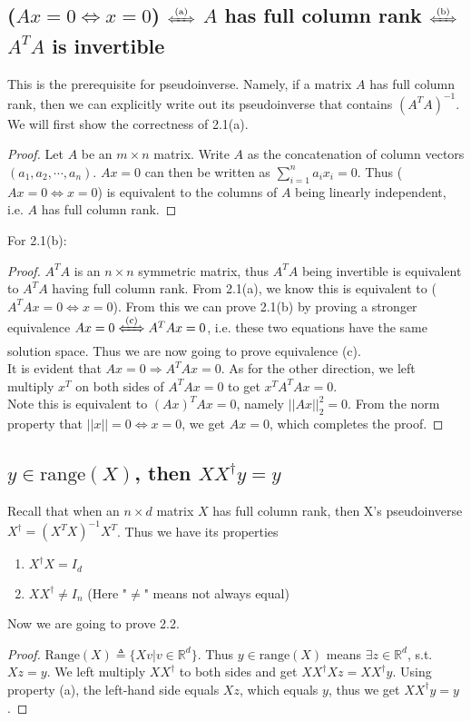 \documentclass[11pt]{article}
\begin{document}
\subsection{($Ax=0 \Leftrightarrow x=0$) $\xLeftrightarrow{\text{(a)}}$ $A$ has full column rank $\xLeftrightarrow{\text{(b)}}$ $A^{T}A$ is invertible}
This is the prerequisite for pseudoinverse. Namely, if a matrix $A$ has full column rank, then we can explicitly write out its pseudoinverse that contains $(A^{T}A)^{-1}$.\\

We will first show the correctness of 2.1(a).
\begin{proof}
Let $A$ be an $m \times n$ matrix. Write $A$ as the concatenation of column vectors $(a_1, a_2, \cdots, a_n)$. $Ax=0$ can then be written as $\sum_{i=1}^n a_i x_i=0$. Thus ($Ax=0 \Leftrightarrow x=0$) is equivalent to the columns of $A$ being linearly independent, i.e. $A$ has full column rank.
\end{proof}
For 2.1(b):
\begin{proof}
$A^{T}A$ is an $n \times n$ symmetric matrix, thus $A^{T}A$ being invertible is equivalent to $A^{T}A$ having full column rank. From 2.1(a), we know this is equivalent to ($A^{T}Ax=0 \Leftrightarrow x=0$). From this we can prove 2.1(b) by proving a stronger equivalence $Ax=0 \xLeftrightarrow{\text{(c)}} A^{T}Ax=0$, i.e. these two equations have the same solution space. Thus we are now going to prove equivalence (c).\\

It is evident that $Ax=0 \Rightarrow A^{T}Ax=0$. As for the other direction, we left multiply $x^{T}$ on both sides of $A^{T}Ax=0$ to get $x^{T}A^{T}Ax=0$. \\

Note this is equivalent to $(Ax)^{T}Ax=0$, namely $||Ax||_2^2=0$. From the norm property that $||x||=0 \Leftrightarrow x=0$, we get $Ax=0$, which completes the proof.
\end{proof}

\subsection{$y \in \text{range}(X)$, then $X X^{\dagger}y = y$}
Recall that when an $n \times d$ matrix $X$ has full column rank, then X's pseudoinverse $X^{\dagger}=(X^{T}X)^{-1}X^{T}$. Thus we have its properties
\begin{enumerate}[label=(\alph*)]
\item $X^{\dagger}X=I_d$
\item $XX^{\dagger} \neq I_n$ (Here "$\neq$" means not always equal)
\end{enumerate}
Now we are going to prove 2.2.
\begin{proof}
$\text{Range}(X) \triangleq \{Xv|v \in \mathbb{R}^d\}$. Thus $y \in \text{range}(X)$ means $\exists z \in \mathbb{R}^d$, s.t. $Xz=y$. We left multiply $XX^{\dagger}$ to both sides and get $XX^{\dagger}Xz=XX^{\dagger}y$. Using property (a), the left-hand side equals $Xz$, which equals $y$, thus we get $X X^{\dagger}y = y$.
\end{proof}
\end{document}
